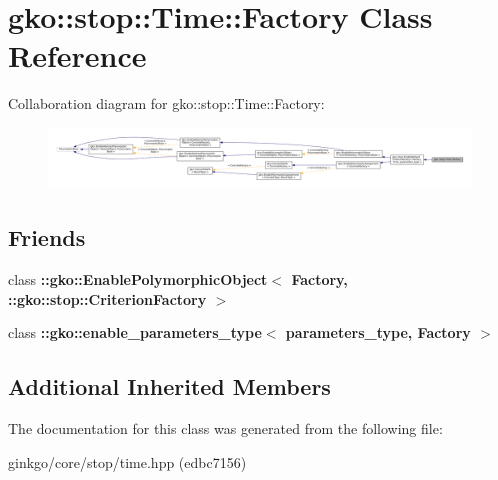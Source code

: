 \hypertarget{classgko_1_1stop_1_1Time_1_1Factory}{}\section{gko\+:\+:stop\+:\+:Time\+:\+:Factory Class Reference}
\label{classgko_1_1stop_1_1Time_1_1Factory}


Collaboration diagram for gko\+:\+:stop\+:\+:Time\+:\+:Factory\+:
\nopagebreak
\begin{figure}[H]
\begin{center}
\leavevmode
\includegraphics[width=350pt]{classgko_1_1stop_1_1Time_1_1Factory__coll__graph}
\end{center}
\end{figure}
\subsection*{Friends}
\begin{DoxyCompactItemize}
\item 
\mbox{\label{classgko_1_1stop_1_1Time_1_1Factory_aaa5507cf00e5361a77971746fefa42e6}} 
class {\bfseries \+::gko\+::\+Enable\+Polymorphic\+Object$<$ Factory, \+::gko\+::stop\+::\+Criterion\+Factory $>$}
\item 
\mbox{\label{classgko_1_1stop_1_1Time_1_1Factory_a0d176cbd42d6214e11aee8c30ca256fc}} 
class {\bfseries \+::gko\+::enable\+\_\+parameters\+\_\+type$<$ parameters\+\_\+type, Factory $>$}
\end{DoxyCompactItemize}
\subsection*{Additional Inherited Members}


The documentation for this class was generated from the following file\+:\begin{DoxyCompactItemize}
\item 
ginkgo/core/stop/time.\+hpp (edbc7156)\end{DoxyCompactItemize}
